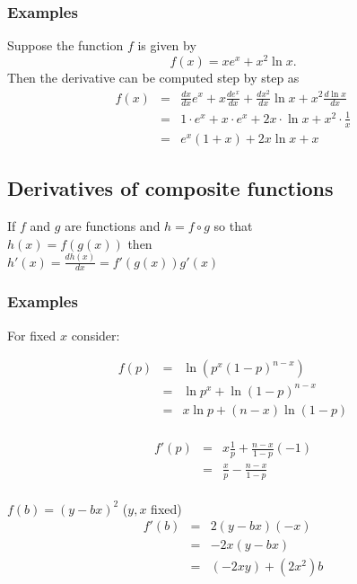 \documentclass[12pt,a4paper]{article}
\theoremstyle{regla}
\theoremstyle{remark}
\theoremstyle{definition}
\theoremstyle{nonumberbreak}
\begin{document}
\subsubsection{Examples}
\begin{xmpl}
Suppose the function $f$ is given by
$$
f(x)=xe^x+x^2\ln x .
$$
Then the derivative can be computed step by step as
\begin{eqnarray*}
f(x)&=&\frac{dx}{dx}e^x+x\frac{de^x}{dx}+\frac{dx^2}{dx}\ln x +x^2\frac{d \ln x}{dx}\\
    &=&1\cdot e^x +     x \cdot e^x     + 2x \cdot \ln x     + x^2 \cdot \frac{1}{x}\\
    &=&e^x \left ( 1+x \right ) + 2x \ln  x +x
\end{eqnarray*}
\end{xmpl}


\subsection{Derivatives of composite functions}
\begin{fbox}
\begin{minipage}{0.97\textwidth}
If $f$ and $g$ are functions and $h=f  \circ g$ so that\\

$h(x) = f(g(x))$ then \\

$h'(x) = \frac{dh(x)}{dx} = f'(g(x)) g'(x)$ \\
\end{minipage}
\end{fbox}
\subsubsection{Examples}
\begin{xmpl}
For fixed $x$ consider:
	
	\begin{eqnarray*}
	f(p) &=& \ln(p^{x} (1-p)^{n-x})\\
	     &=& \ln p^{x} + \ln(1-p)^{n-x}\\%
	     &=& x \ln p + (n-x) \ln (1-p)\\
	\end{eqnarray*}
	
	\begin{eqnarray*}
  f'(p)&=& x \frac{1}{p} + \frac{n-x}{1-p}(-1)\\
	     &=& \frac{x}{p} - \frac{n-x}{1-p}\\
	\end{eqnarray*}

\end{xmpl}
\begin{xmpl}	
	$f(b) = (y-bx)^2$ ($y,x$ fixed)\\
	
	\begin{eqnarray*}
	f'(b)&=& 2 (y-bx) (-x)\\
	     &=& -2x (y-bx)\\
	     &=&(-2xy) + (2x^2)b   
	\end{eqnarray*}
\end{xmpl}	
	
\end{document}
